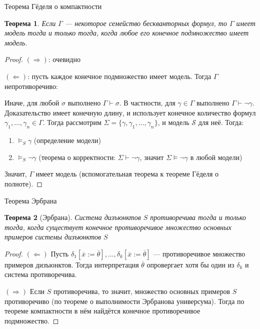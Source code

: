 \documentclass[aspectratio=169]{beamer}
\newtheorem{thm}{Теорема}[section]
\begin{document}
\begin{frame}{Теорема Гёделя о компактности}
\begin{thm}Если $\Gamma$ --- некоторое семейство бескванторных формул, то $\Gamma$ имеет модель
тогда и только тогда, когда любое его конечное подмножество имеет модель.\end{thm}
\begin{proof}
$(\Rightarrow)$: очевидно

$(\Leftarrow)$: пусть каждое конечное подмножество имеет модель. Тогда $\Gamma$ непротиворечиво:

{\footnotesize Иначе, для любой $\sigma$ выполнено $\Gamma\vdash\sigma$. В частности, для $\gamma\in\Gamma$
выполнено $\Gamma\vdash\neg\gamma$. Доказательство имеет конечную длину, и использует конечное
количество формул $\gamma_1,\dots,\gamma_n\in\Gamma$. Тогда рассмотрим $\Sigma = \{\gamma,\gamma_1,\dots,\gamma_n\}$, 
и модель $\mathcal{S}$ для неё. Тогда:
\begin{enumerate}
\item $\models_{S}\gamma$ (определение модели)
\item $\models_{S}\neg\gamma$ (теорема о корректности: $\Sigma\vdash\neg\gamma$, значит $\Sigma\models\neg\gamma$ в любой модели)
\end{enumerate}}

Значит, $\Gamma$ имеет модель (вспомогательная теорема к теореме Гёделя о полноте).
\end{proof}
\end{frame}

\begin{frame}{Теорема Эрбрана}
\begin{thm}[Эрбрана]Система дизъюнктов $S$ противоречива тогда и только тогда, когда существует
конечное противоречивое множество основных примеров системы дизъюнктов $S$\end{thm}
\begin{proof}$(\Leftarrow)$ 
Пусть $\delta_1[\overline{x} := \overline{\theta}],\dots,\delta_k[\overline{x} := \overline{\theta}]$ 
--- противоречивое множество примеров дизъюнктов. Тогда интерпретация $\overline{\theta}$
опровергает хотя бы один из $\delta_k$ и система противоречива.

$(\Rightarrow)$ Если $S$ противоречива, то значит, множество основных примеров $S$
противоречиво (по теореме о выполнимости Эрбранова универсума). Тогда по теореме компактности
в нём найдётся конечное противоречивое подмножество.
\end{proof}
\end{frame}
\end{document}
